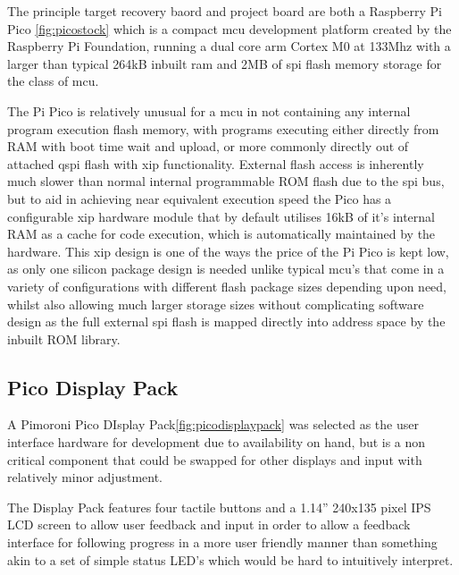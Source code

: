 The principle target recovery baord and project board are both a Raspberry Pi Pico \autoref{fig:picostock} which is a compact \gls{mcu} development platform created by the Raspberry Pi Foundation, running a dual core \gls{arm} Cortex M0 at 133Mhz with a larger than typical 264kB inbuilt \gls{ram} and 2MB of \gls{spi} flash memory storage for the class of \gls{mcu}\cite{ltdBuyRaspberryPi}.

The Pi Pico is relatively unusual for a \gls{mcu} in not containing any internal program execution flash memory, with programs executing either directly from RAM with boot time wait and upload, or more commonly directly out of attached \gls{qspi} flash with \gls{xip} functionality. External flash access is inherently much slower than normal internal programmable ROM flash due to the \gls{spi} bus, but to aid in achieving near equivalent execution speed the Pico has a configurable \gls{xip} hardware module that by default utilises 16kB of it's internal RAM as a cache for code execution, which is automatically maintained by the hardware. This \gls{xip} design is one of the ways the price of the Pi Pico is kept low, as only one silicon package design is needed unlike typical \gls{mcu}'s that come in a variety of configurations with different flash package sizes depending upon need, whilst also allowing much larger storage sizes without complicating software design as the full external \gls{spi} flash is mapped directly into address space by the inbuilt ROM library.



\clearpage
\subsection{Pico Display Pack}
A Pimoroni Pico DIsplay Pack\autoref{fig:picodisplaypack} was selected as the user interface hardware for development due to availability on hand, but is a non critical component that could be swapped for other displays and input with relatively minor adjustment.

The Display Pack features four tactile buttons and a 1.14” 240x135 pixel IPS LCD screen to allow user feedback and input in order to allow a feedback interface for following progress in a more user friendly manner than something akin to a set of simple status LED's which would be hard to intuitively interpret.

